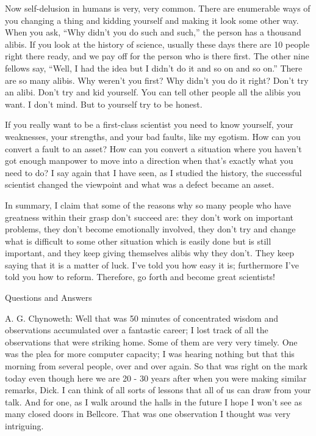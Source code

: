 \documentclass{article}
\begin{document}
Now self-delusion in humans is very, very common. There are enumerable ways of you changing a thing and kidding yourself and making it look some other way. When you ask, ``Why didn't you do such and such,'' the person has a thousand alibis. If you look at the history of science, usually these days there are 10 people right there ready, and we pay off for the person who is there first. The other nine fellows say, ``Well, I had the idea but I didn't do it and so on and so on.'' There are so many alibis. Why weren't you first? Why didn't you do it right? Don't try an alibi. Don't try and kid yourself. You can tell other people all the alibis you want. I don't mind. But to yourself try to be honest.

If you really want to be a first-class scientist you need to know yourself, your weaknesses, your strengths, and your bad faults, like my egotism. How can you convert a fault to an asset? How can you convert a situation where you haven't got enough manpower to move into a direction when that's exactly what you need to do? I say again that I have seen, as I studied the history, the successful scientist changed the viewpoint and what was a defect became an asset.

In summary, I claim that some of the reasons why so many people who have greatness within their grasp don't succeed are: they don't work on important problems, they don't become emotionally involved, they don't try and change what is difficult to some other situation which is easily done but is still important, and they keep giving themselves alibis why they don't. They keep saying that it is a matter of luck. I've told you how easy it is; furthermore I've told you how to reform. Therefore, go forth and become great scientists!



Questions and Answers

A. G. Chynoweth: Well that was 50 minutes of concentrated wisdom and observations accumulated over a fantastic career; I lost track of all the observations that were striking home. Some of them are very very timely. One was the plea for more computer capacity; I was hearing nothing but that this morning from several people, over and over again. So that was right on the mark today even though here we are 20 - 30 years after when you were making similar remarks, Dick. I can think of all sorts of lessons that all of us can draw from your talk. And for one, as I walk around the halls in the future I hope I won't see as many closed doors in Bellcore. That was one observation I thought was very intriguing.
\end{document}

